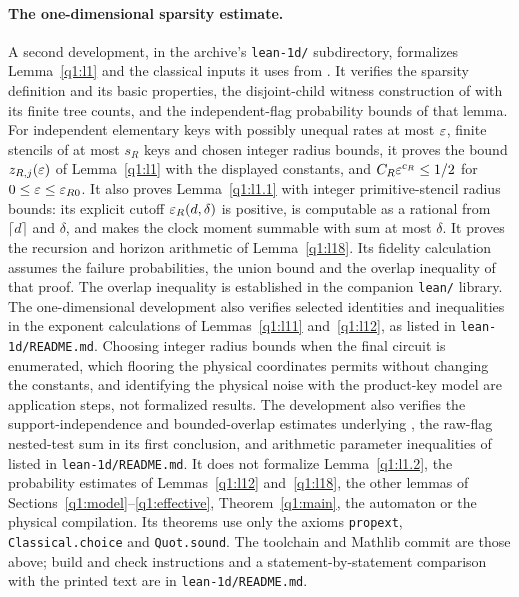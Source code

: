 \paragraph{The one-dimensional sparsity estimate.}
A second development, in the archive's \texttt{lean-1d/} subdirectory,
formalizes Lemma~\ref{q1:l1} and the classical inputs it uses from
\cite{DMNoise1D2026}. It verifies the sparsity definition
\cite[Definition~\ref*{cl:def:sparse}]{DMNoise1D2026} and its basic
properties, the disjoint-child witness construction of
\cite[Lemma~\ref*{cl:lem:sparse-witness}]{DMNoise1D2026} with its finite
tree counts, and the independent-flag probability bounds of that lemma.
For independent elementary keys with possibly unequal rates at most
\(\varepsilon\), finite stencils of at most \(s_R\) keys and chosen integer radius
bounds, it proves the bound \(z_{R,j}(\varepsilon)\) of Lemma~\ref{q1:l1} with the
displayed constants, and \(C_R \varepsilon^{c_R}\le 1/2\) for
\(0\le \varepsilon\le \varepsilon_{R0}\). It also proves Lemma~\ref{q1:l1.1} with integer primitive-stencil
radius bounds: its explicit cutoff \(\varepsilon_R(d,\delta)\) is positive,
is computable as a rational from \(\lceil d\rceil\) and \(\delta\),
and makes the clock moment summable with sum at most \(\delta\).
It proves the recursion and horizon arithmetic of Lemma~\ref{q1:l18}.
Its fidelity calculation assumes the failure probabilities, the union
bound and the overlap inequality of that proof. The overlap inequality
is established in the companion \texttt{lean/} library. The
one-dimensional development also verifies selected identities and
inequalities in the exponent calculations of Lemmas~\ref{q1:l11}
and~\ref{q1:l12}, as listed in \texttt{lean-1d/README.md}.
Choosing integer radius bounds when the final
circuit is enumerated, which flooring the physical coordinates permits
without changing the constants, and identifying the physical noise with
the product-key model are application steps, not formalized results.
The development also verifies the support-independence and
bounded-overlap estimates underlying
\cite[Lemma~\ref*{cl:lem:joint}]{DMNoise1D2026}, the raw-flag
nested-test sum in its first conclusion, and arithmetic parameter
inequalities of \cite{DMNoise1D2026} listed in \texttt{lean-1d/README.md}. It does not formalize
Lemma~\ref{q1:l1.2}, the probability estimates of Lemmas~\ref{q1:l12}
and~\ref{q1:l18}, the other lemmas of
Sections~\ref{q1:model}--\ref{q1:effective}, Theorem~\ref{q1:main}, the
automaton or the physical compilation. Its theorems use only the axioms
\texttt{propext}, \texttt{Classical.choice} and \texttt{Quot.sound}. The toolchain and
Mathlib commit are those above; build and check instructions and a
statement-by-statement comparison with the printed text are in
\texttt{lean-1d/README.md}.
